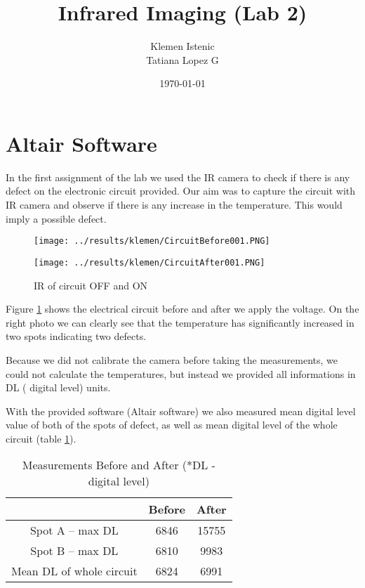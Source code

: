 \documentclass{article}
\begin{document}
\title{Infrared Imaging (Lab 2)}
\date {\today}
\author{Klemen Istenic\\Tatiana Lopez G}
\maketitle

\section{Altair Software}
In the first assignment of the lab we used the IR 
camera to check if there is any defect on the electronic circuit 
provided.  Our aim was to capture the circuit with IR camera 
and observe if there is any increase in the temperature. This 
would imply a possible defect.
 
\begin{figure}[H]
\centering
\begin{minipage}[b]{0.45\linewidth}
\texttt{[image: ../results/klemen/CircuitBefore001.PNG]}
\end{minipage}
\quad
\begin{minipage}[b]{0.45\linewidth}
\texttt{[image: ../results/klemen/CircuitAfter001.PNG]}
\end{minipage}
\caption{IR of circuit OFF and ON}
\label{fig:p1}
\end{figure}

Figure \ref{fig:p1} shows the electrical circuit before and after we apply the 
voltage. On the right photo we can clearly see that the temperature has 
significantly increased in two spots indicating two defects.

Because we did not 
calibrate the camera before taking the measurements, we could not calculate 
the temperatures, but instead we provided all informations in DL (
digital level) units.

With the provided software (Altair software) we also measured 
mean digital level value  of both of the spots of defect, 
as well as mean digital level of the whole circuit
 (table \ref{tb:tb1}). 

\begin{table}[H]
\centering
\begin{tabular}{|c|c|c|}
\hline
&Before &	After \\
\hline
Spot A – max DL	&	6846	&15755\\
Spot B – max DL &	6810	&9983\\
Mean DL of whole circuit &	6824	&6991\\
\hline
\end{tabular}
\caption{Measurements Before and After (*DL - digital level)}
\label{tb:tb1}
\end{table} 
\end{document}
